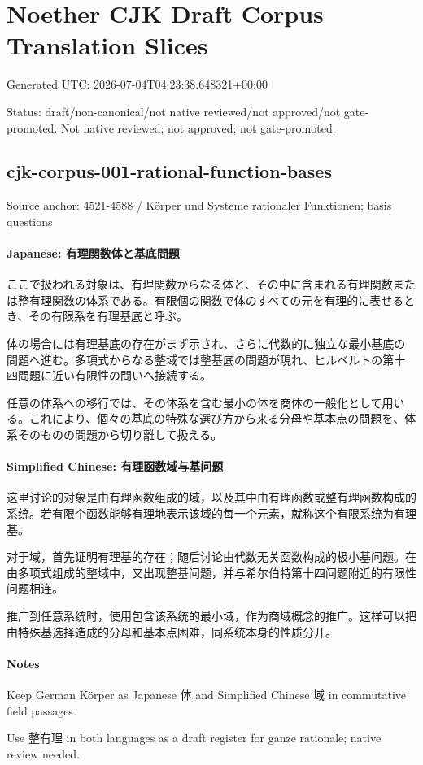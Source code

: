 \documentclass[11pt]{article}
\begin{document}
\section*{Noether CJK Draft Corpus Translation Slices}
Generated UTC: 2026-07-04T04:23:38.648321+00:00
\par
Status: draft/non-canonical/not native reviewed/not approved/not gate-promoted. Not native reviewed; not approved; not gate-promoted.
\par
\subsection*{cjk-corpus-001-rational-function-bases}
Source anchor: 4521-4588 / Körper und Systeme rationaler Funktionen; basis questions
\par
\paragraph{Japanese: 有理関数体と基底問題}
ここで扱われる対象は、有理関数からなる体と、その中に含まれる有理関数または整有理関数の体系である。有限個の関数で体のすべての元を有理的に表せるとき、その有限系を有理基底と呼ぶ。\par
体の場合には有理基底の存在がまず示され、さらに代数的に独立な最小基底の問題へ進む。多項式からなる整域では整基底の問題が現れ、ヒルベルトの第十四問題に近い有限性の問いへ接続する。\par
任意の体系への移行では、その体系を含む最小の体を商体の一般化として用いる。これにより、個々の基底の特殊な選び方から来る分母や基本点の問題を、体系そのものの問題から切り離して扱える。\par
\paragraph{Simplified Chinese: 有理函数域与基问题}
这里讨论的对象是由有理函数组成的域，以及其中由有理函数或整有理函数构成的系统。若有限个函数能够有理地表示该域的每一个元素，就称这个有限系统为有理基。\par
对于域，首先证明有理基的存在；随后讨论由代数无关函数构成的极小基问题。在由多项式组成的整域中，又出现整基问题，并与希尔伯特第十四问题附近的有限性问题相连。\par
推广到任意系统时，使用包含该系统的最小域，作为商域概念的推广。这样可以把由特殊基选择造成的分母和基本点困难，同系统本身的性质分开。\par
\paragraph{Notes}
Keep German Körper as Japanese 体 and Simplified Chinese 域 in commutative field passages.\par
Use 整有理 in both languages as a draft register for ganze rationale; native review needed.\par
\end{document}
